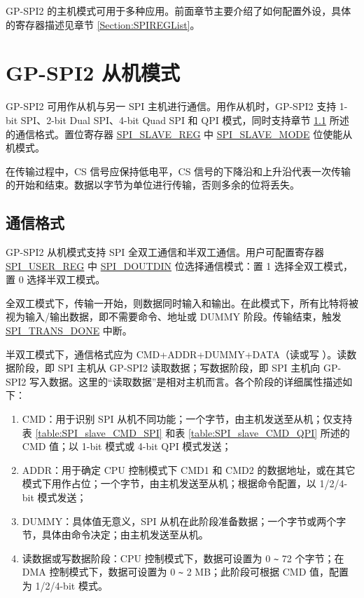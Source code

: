 \documentclass[main\_\_CN.tex]{subfiles}
\begin{document}
GP-SPI2 的主机模式可用于多种应用。前面章节主要介绍了如何配置外设，具体的寄存器描述见章节 \ref{Section:SPIREGList}。


\section{GP-SPI2 从机模式} \label{GP-SPI2 slave mode}

GP-SPI2 可用作从机与另一 SPI 主机进行通信。用作从机时，GP-SPI2 支持 1-bit SPI、2-bit Dual SPI、4-bit Quad SPI 和 QPI 模式，同时支持章节 \ref{slave communication format} 所述的通信格式。置位寄存器 \hyperref[regdesc:SPISLAVEREG]{SPI\_SLAVE\_REG} 中 \hyperref[fielddesc:SPISLAVEMODE]{SPI\_SLAVE\_MODE} 位使能从机模式。


在传输过程中，CS 信号应保持低电平，CS 信号的下降沿和上升沿代表一次传输的开始和结束。数据以字节为单位进行传输，否则多余的位将丢失。

\subsection{通信格式}\label{slave communication format}

GP-SPI2 从机模式支持 SPI 全双工通信和半双工通信。用户可配置寄存器 \hyperref[regdesc:SPIUSERREG]{SPI\_USER\_REG} 中 \hyperref[fielddesc:SPIDOUTDIN]{SPI\_DOUTDIN} 位选择通信模式：置 1 选择全双工模式，置 0 选择半双工模式。

全双工模式下，传输一开始，则数据同时输入和输出。在此模式下，所有比特将被视为输入/输出数据，即不需要命令、地址或 DUMMY 阶段。传输结束，触发 \hyperref[fielddesc:SPITRANSDONE]{SPI\_TRANS\_DONE} 中断。

半双工模式下，通信格式应为 CMD+ADDR+DUMMY+DATA（读或写 ）。读数据阶段，即 SPI 主机从 GP-SPI2 读取数据；写数据阶段，即 SPI 主机向 GP-SPI2 写入数据。这里的“读取数据”是相对主机而言。各个阶段的详细属性描述如下：

\begin{enumerate}
   \item CMD：用于识别 SPI 从机不同功能；一个字节，由主机发送至从机；仅支持表 \ref{table:SPI_slave_CMD_SPI} 和表 \ref{table:SPI_slave_CMD_QPI} 所述的 CMD 值；以 1-bit 模式或 4-bit QPI 模式发送；
   \item ADDR：用于确定 CPU 控制模式下 CMD1 和 CMD2 的数据地址，或在其它模式下用作占位；一个字节，由主机发送至从机；根据命令配置，以 1/2/4-bit 模式发送；
   \item DUMMY：具体值无意义，SPI 从机在此阶段准备数据；一个字节或两个字节，具体由命令决定；由主机发送至从机。

   \item 读数据或写数据阶段：CPU 控制模式下，数据可设置为 0 \verb+~+ 72 个字节；在 DMA 控制模式下，数据可设置为 0 \verb+~+ 2 MB；此阶段可根据 CMD 值，配置为 1/2/4-bit 模式。
   \end{enumerate}
\end{document}
